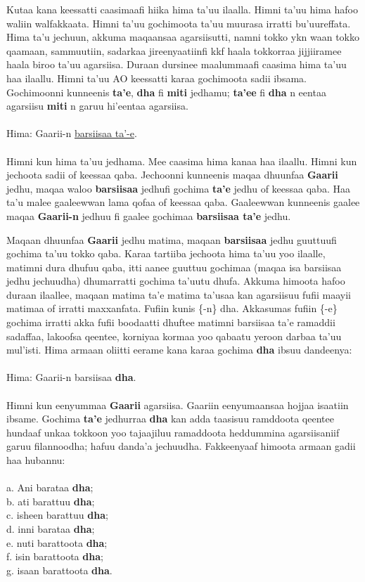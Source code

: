 \documentclass[11pt,b5paper]{book}
\begin{document}
Kutaa kana keessatti caasimaafi hiika hima ta’uu ilaalla. Himni ta’uu hima hafoo waliin walfakkaata. Himni ta’uu gochimoota ta’uu muurasa irratti bu’uureffata. Hima ta’u jechuun, akkuma maqaansaa agarsiisutti, namni tokko ykn waan tokko qaamaan, sammuutiin, sadarkaa jireenyaatiinfi kkf haala tokkorraa jijjiiramee haala biroo ta’uu agarsiisa. Duraan dursinee maalummaafi caasima hima ta’uu
haa ilaallu. Himni ta’uu AO keessatti karaa gochimoota sadii ibsama. Gochimoonni kunneenis \textbf{ta’e}, \textbf{dha} fi \textbf{miti} jedhamu; \textbf{ta’ee} fi \textbf{dha} n eentaa agarsiisu \textbf{miti} n garuu hi'eentaa agarsiisa. \\
\\
Hima: Gaarii-n \underline{barsiisaa ta’-e}. \\
\\

Himni kun hima ta’uu jedhama. Mee caasima hima kanaa haa ilaallu. Himni kun jechoota sadii of
keessaa qaba. Jechoonni kunneenis maqaa dhuunfaa \textbf{Gaarii} jedhu, maqaa waloo \textbf{barsiisaa} jedhufi gochima \textbf{ta’e} jedhu of keessaa qaba. Haa ta’u malee gaaleewwan lama qofaa of keessaa qaba. Gaaleewwan kunneenis gaalee maqaa \textbf{Gaarii-n} jedhuu fi gaalee gochimaa \textbf{barsiisaa ta’e} jedhu.

Maqaan dhuunfaa \textbf{Gaarii} jedhu matima, maqaan \textbf{barsiisaa} jedhu guuttuufi gochima ta’uu tokko qaba. Karaa tartiiba jechoota hima ta’uu yoo ilaalle, matimni dura dhufuu qaba, itti
aanee guuttuu gochimaa (maqaa isa barsiisaa jedhu jechuudha) dhumarratti gochima ta’uutu dhufa. Akkuma himoota hafoo duraan ilaallee, maqaan matima ta’e matima ta’usaa kan agarsiisuu fufii maayii matimaa of irratti maxxanfata. Fufiin kunis \{-n\} dha. Akkasumas fufiin \{-e\} gochima irratti akka fufii
boodaatti dhuftee matimni barsiisaa ta’e ramaddii sadaffaa, lakoofsa qeentee, korniyaa kormaa yoo qabaatu yeroon darbaa ta’uu mul’isti. Hima armaan oliitti eerame kana karaa gochima
\textbf{dha} ibsuu dandeenya: \\
\\
Hima: Gaarii-n barsiisaa \textbf{dha}.\\
\\

Himni kun eenyummaa \textbf{Gaarii} agarsiisa. Gaariin eenyumaansaa hojjaa isaatiin ibsame. Gochima \textbf{ta’e} jedhurraa \textbf{dha} kan adda taasisuu ramddoota qeentee hundaaf unkaa tokkoon yoo
tajaajiluu ramaddoota heddummina agarsiisaniif garuu filannoodha; hafuu danda’a jechuudha. Fakkeenyaaf himoota armaan gadii haa hubannu: \\
\\
a. Ani barataa \textbf{dha}; \\
b. ati barattuu \textbf{dha}; \\
c. isheen barattuu \textbf{dha}; \\
d. inni barataa \textbf{dha}; \\
e. nuti barattoota \textbf{dha}; \\
f. isin barattoota \textbf{dha}; \\
g. isaan barattoota \textbf{dha}.
\end{document}

